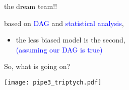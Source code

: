 %
%
\begin{lhframe}[rhgraphic={\texttt{[image: pipe3\_reg2.png]}}]
	{the dream team!!}
	
	based on \textcolor{blue}{DAG} and \textcolor{blue}{statistical analysis},
	\begin{itemize}
		\item the less biased model is the second, \\
		{\small \textcolor{blue}{(assuming our DAG is true)} }
	\end{itemize}
\end{lhframe}
%
%
\begin{frame}
	{So, what is going on?}
	
	\begin{figure*}
		\texttt{[image: pipe3\_triptych.pdf]}
	\end{figure*}
\end{frame}
%
%
